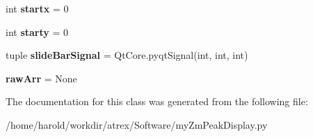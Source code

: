 \begin{DoxyCompactItemize}
\item 
\hypertarget{classmyZmPeakDisplay_1_1myZmPeakDisplay_adff5c6da641109f0677fa397b0a3331d}{int {\bfseries startx} = 0}\label{classmyZmPeakDisplay_1_1myZmPeakDisplay_adff5c6da641109f0677fa397b0a3331d}

\item 
\hypertarget{classmyZmPeakDisplay_1_1myZmPeakDisplay_a149e621976069c20cd89545890f708ea}{int {\bfseries starty} = 0}\label{classmyZmPeakDisplay_1_1myZmPeakDisplay_a149e621976069c20cd89545890f708ea}

\item 
\hypertarget{classmyZmPeakDisplay_1_1myZmPeakDisplay_acb4b811dcb4c35efd8dcedcccd1050db}{tuple {\bfseries slide\-Bar\-Signal} = Qt\-Core.\-pyqt\-Signal(int, int, int)}\label{classmyZmPeakDisplay_1_1myZmPeakDisplay_acb4b811dcb4c35efd8dcedcccd1050db}

\item 
\hypertarget{classmyZmPeakDisplay_1_1myZmPeakDisplay_add6e28bc8fcf22321234c3c76090d0b4}{{\bfseries raw\-Arr} = None}\label{classmyZmPeakDisplay_1_1myZmPeakDisplay_add6e28bc8fcf22321234c3c76090d0b4}

\end{DoxyCompactItemize}


The documentation for this class was generated from the following file\-:\begin{DoxyCompactItemize}
\item 
/home/harold/workdir/atrex/\-Software/my\-Zm\-Peak\-Display.\-py\end{DoxyCompactItemize}
